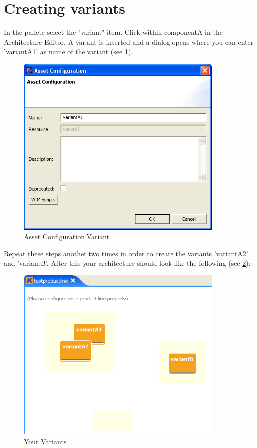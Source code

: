 \section{Creating variants}

In the pallete select the "variant" item. Click within componentA in 
the Architecture Editor. A variant is inserted and a dialog opens where you can enter 'variantA1' as name of
the variant (see \ref{variant1}). 

\begin{figure}[h!]
\begin{center}
\includegraphics[width=10cm]{tutorial9.png}
   \caption{Asset Configuration Variant}
   \label{variant1}
\end{center}
\end{figure}\par

Repeat these steps another two times in order to create the variants 'variantA2' and 'variantB'.
After this your architecture should look like the following (see \ref{variant2}):

\begin{figure}[h!]
\begin{center}
\includegraphics[width=10cm]{tutorial10.png}
   \caption{Your Variants}
   \label{variant2}
\end{center}
\end{figure}\par


